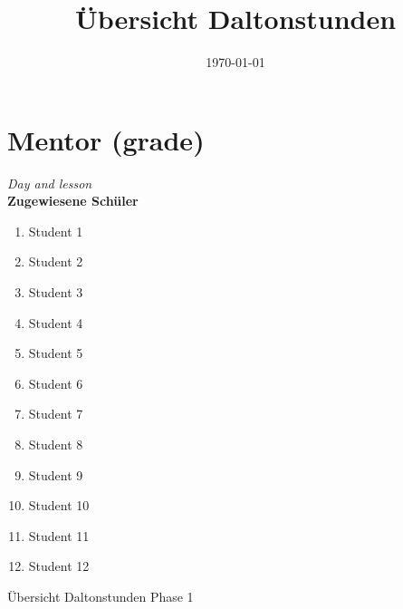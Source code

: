 \documentclass[12pt, a4paper, landscape, ngerman]{scrreprt}
\title{Übersicht Daltonstunden}
\date{\today}
\begin{document}
    \maketitle

    \newpage
    \section{Mentor (grade)}
    \textit{Day and lesson} \\

    \textbf{Zugewiesene Schüler}
    \begin{enumerate}
        \item{Student 1}
        \item{Student 2}
        \item{Student 3}
        \item{Student 4}
        \item{Student 5}
        \item{Student 6}
        \item{Student 7}
        \item{Student 8}
        \item{Student 9}
        \item{Student 10}
        \item{Student 11}
        \item{Student 12}
    \end{enumerate}
    \newpage


    \begingroup

    \begin{center}
        \huge{Übersicht Daltonstunden Phase 1}
    \end{center}

    \footnotesize
    \setlength{\tabcolsep}{3pt}
\end{document}
